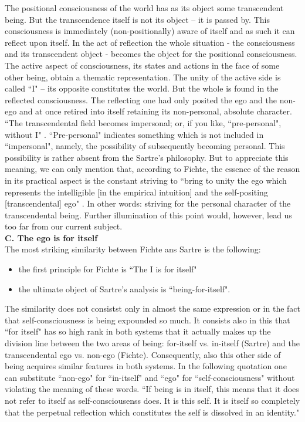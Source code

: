 The positional consciousness of the world has as its object some transcendent being. But the transcendence itself 
is not its object -- it is passed by. This consciousness is immediately (non-positionally) aware of itself and as such 
it can reflect upon itself. In the act of reflection the whole situation - the consciousness and its transcendent object 
- becomes the object for the positional consciousness. The active aspect of consciousness, its states and actions in 
the face of some other being, obtain a thematic representation. The unity of  the active side is called ``I" -- its 
opposite constitutes the world. But the whole is found in the reflected consciousness. The reflecting one had only 
posited the ego and the non-ego and at once retired into itself retaining its non-personal, absolute character. ``The 
transcendental field becomes impersonal; or, if you like, ``pre-personal", without I" \cite{ToE}. ``Pre-personal" indicates 
something which is not included in ``impersonal", namely, the possibility of subsequently becoming personal. 
This possibility is rather absent from the Sartre's philosophy. But to appreciate this meaning, we can only 
mention that, according to Fichte, the essence of the reason in its practical aspect is the constant striving to ``bring 
to unity the ego which represents the intelligible [in the empirical intuition] and the self-positing [transcendental] 
ego" \cite{RoA}. In other words: striving for the personal character of the transcendental being. Further illumination of this 
point would, however, lead us too far from our current subject. \\[1ex]
{\bf C. The ego is for itself} \\
The most striking similarity between Fichte ans Sartre is the following:
\begin{itemize}
\item the first principle for Fichte is ``The I is for itself"
\item the ultimate object of Sartre's analysis is ``being-for-itself".
\end{itemize}
The similarity does not consistst only in almost the same expression or in the fact that self-consciousness is being 
expounded so much. It consists also in this that ``for itself" has so high rank in both systems that it actually 
makes up the division line between the two areas of being: for-itself vs. in-itself (Sartre) and the transcendental ego 
vs. non-ego (Fichte). Consequently, also this other side of being acquires similar features in both systems. In the 
following quotation one can substitute ``non-ego" for ``in-itself" and ``ego" for ``self-consciousness" without 
violating the meaning of these words. ``If being is in itself, this means that it does not refer to itself as self-consciousenss does. It is this self. It is itself so completely that the perpetual reflection which constitutes the self 
is dissolved in an identity." \cite{BN}   

